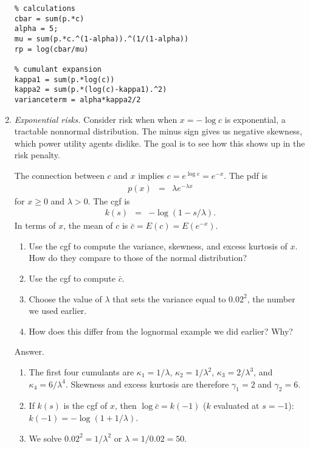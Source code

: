 \begin{enumerate}
\begin{verbatim}
% calculations
cbar = sum(p.*c)
alpha = 5;
mu = sum(p.*c.^(1-alpha)).^(1/(1-alpha))
rp = log(cbar/mu)

% cumulant expansion
kappa1 = sum(p.*log(c))
kappa2 = sum(p.*(log(c)-kappa1).^2)
varianceterm = alpha*kappa2/2
\end{verbatim}

\item {\it Exponential risks.\/}
Consider risk when when $x = - \log c $ is exponential,
a tractable nonnormal distribution.
The minus sign gives us negative skewness, which power utility agents
dislike.
The goal is to see how this shows up in the risk penalty.

The connection between $c$ and $x$ implies $c = e^{\log c} = e^{-x}$.
The pdf is
\begin{eqnarray*}
    p(x)  &=& \lambda e^{-\lambda x}
\end{eqnarray*}
for $x \geq 0$ and $\lambda > 0$.
The cgf is
\begin{eqnarray*}
    k(s)  &=& - \log \left( 1 - s/\lambda \right) .
\end{eqnarray*}
In terms of $x$, the mean of $c$ is $\bar{c} = E(c) = E (e^{-x})$.

\begin{enumerate}
\item Use the cgf to compute the variance, skewness, and excess kurtosis
of $x$.  How do they compare to those of the normal distribution?
\item Use the cgf to compute $\bar{c}$.
\item Choose the value of $\lambda$ that sets
the variance equal to $0.02^2$, the number we used earlier.
\item How does this differ from the lognormal example we did earlier?  Why?
\end{enumerate}
%
Answer.
\begin{enumerate}
\item The first four cumulants are
$\kappa_1 = 1/\lambda$,
$\kappa_2 = 1/\lambda^2$,
$\kappa_3 = 2/\lambda^3$,
and $\kappa_4 = 6/\lambda^4$.
Skewness and excess kurtosis are therefore
$\gamma_1 = 2$ and $\gamma_2 = 6$.

\item If $k(s)$ is the cgf of $x$,
then $\log \bar{c} = k(-1)$ ($k$ evaluated at $s=-1$):
$k(-1) = - \log (1 + 1/\lambda)$.

\item We solve $0.02^2 = 1/\lambda^2$ or $\lambda = 1/0.02 = 50$.


\end{enumerate}
\end{enumerate}

